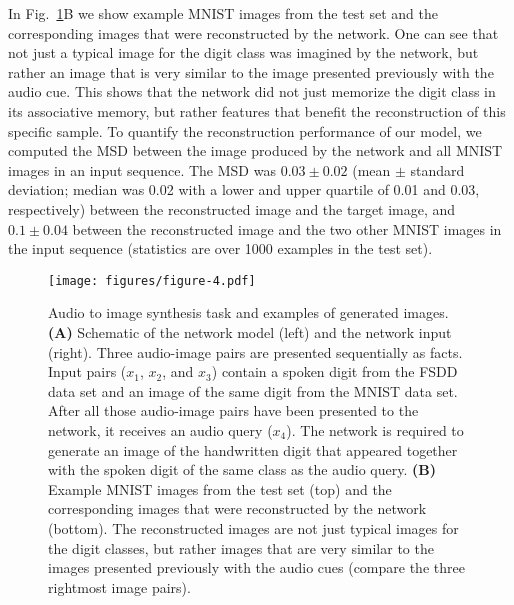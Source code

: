 \documentclass{article}
\begin{document}
In Fig.~\ref{fig:fig4}B we show example MNIST images from the test set and the corresponding images that were reconstructed by the network. One can see that not just a typical image for the digit class was imagined by the network, but rather an image that is very similar to the image presented previously with the audio cue. This shows that the network did not just memorize the digit class in its associative memory, but rather features that benefit the reconstruction of this specific sample.
To quantify the reconstruction performance of our model, we computed the \gls{MSD} between the image produced by the network and all MNIST images in an input sequence. The \gls{MSD} was $0.03\pm0.02$ (mean $\pm$ standard deviation; median was \num{0.02} with a lower and upper quartile of \num{0.01} and \num{0.03}, respectively) between the reconstructed image and the target image, and $0.1\pm 0.04$ between the reconstructed image and the two other MNIST images in the input sequence (statistics are over \num{1000} examples in the test set). 

\begin{figure}\centering
\texttt{[image: figures/figure-4.pdf]}
\caption{Audio to image synthesis task and examples of generated images.
\textbf{(A)} Schematic of the network model (left) and the network input (right). Three audio-image pairs are presented sequentially as facts. Input pairs ($x_1$, $x_2$, and $x_3$) contain a spoken digit from the FSDD data set and an image of the same digit from the MNIST data set. After all those audio-image pairs have been presented to the network, it receives an audio query ($x_4$). The network is required to generate an image of the handwritten digit that appeared together with the spoken digit of the same class as the audio query.
\textbf{(B)} Example MNIST images from the test set (top) and the corresponding images that were reconstructed by the network (bottom). The reconstructed images are not just typical images for the digit classes, but rather images that are very similar to the images presented previously with the audio cues (compare the three rightmost image pairs).}
\label{fig:fig4}
\end{figure}
\end{document}
